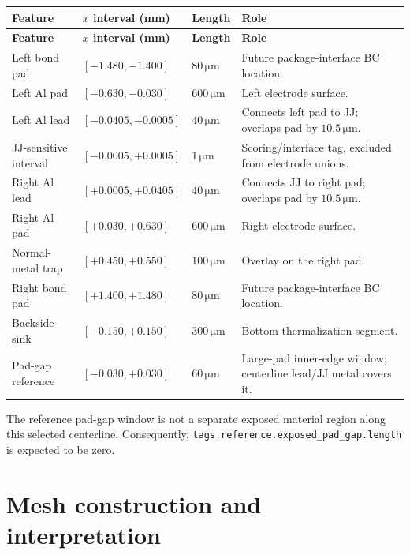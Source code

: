\documentclass[11pt]{article}
\begin{document}
\begin{longtable}{>{\RaggedRight\arraybackslash}p{} >{\RaggedRight\arraybackslash}p{} >{\RaggedRight\arraybackslash}p{} >{\RaggedRight\arraybackslash}p{}}
\toprule
\textbf{Feature} & \textbf{$x$ interval (mm)} & \textbf{Length} & \textbf{Role} \\
\midrule
\endfirsthead
\toprule
\textbf{Feature} & \textbf{$x$ interval (mm)} & \textbf{Length} & \textbf{Role} \\
\midrule
\endhead
Left bond pad & $[-1.480,-1.400]$ & $80\,\mathrm{\mu m}$ & Future package-interface BC location. \\
Left Al pad & $[-0.630,-0.030]$ & $600\,\mathrm{\mu m}$ & Left electrode surface. \\
Left Al lead & $[-0.0405,-0.0005]$ & $40\,\mathrm{\mu m}$ & Connects left pad to JJ; overlaps pad by $10.5\,\mathrm{\mu m}$. \\
JJ-sensitive interval & $[-0.0005,+0.0005]$ & $1\,\mathrm{\mu m}$ & Scoring/interface tag, excluded from electrode unions. \\
Right Al lead & $[+0.0005,+0.0405]$ & $40\,\mathrm{\mu m}$ & Connects JJ to right pad; overlaps pad by $10.5\,\mathrm{\mu m}$. \\
Right Al pad & $[+0.030,+0.630]$ & $600\,\mathrm{\mu m}$ & Right electrode surface. \\
Normal-metal trap & $[+0.450,+0.550]$ & $100\,\mathrm{\mu m}$ & Overlay on the right pad. \\
Right bond pad & $[+1.400,+1.480]$ & $80\,\mathrm{\mu m}$ & Future package-interface BC location. \\
Backside sink & $[-0.150,+0.150]$ & $300\,\mathrm{\mu m}$ & Bottom thermalization segment. \\
Pad-gap reference & $[-0.030,+0.030]$ & $60\,\mathrm{\mu m}$ & Large-pad inner-edge window; centerline lead/JJ metal covers it. \\
\bottomrule
\end{longtable}

The reference pad-gap window is not a separate exposed material region along this selected centerline. Consequently, \texttt{tags.reference.exposed\_pad\_gap.length} is expected to be zero.

\section{Mesh construction and interpretation}
\end{document}
